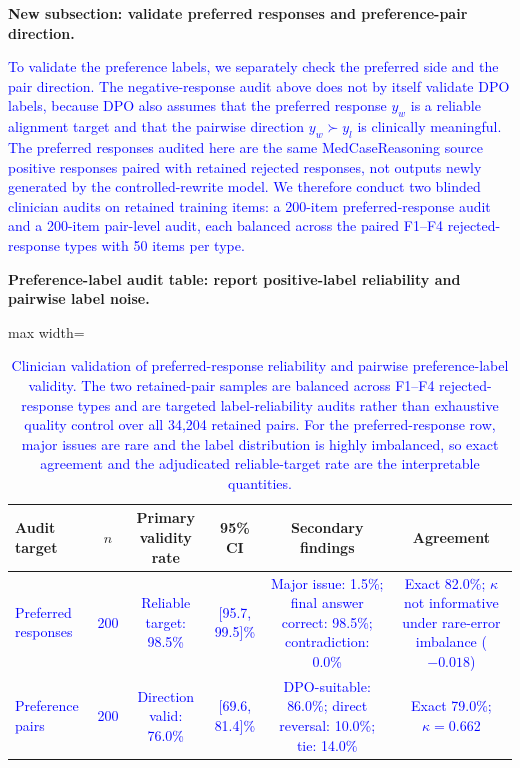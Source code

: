 \documentclass[12pt]{article}
\newcommand{\added}[1]{\textcolor{blue}{#1}}
\begin{document}
\textbf{New subsection: validate preferred responses and preference-pair direction.}
\begin{displayquote}
\added{To validate the preference labels, we separately check the preferred side and the pair direction. The negative-response audit above does not by itself validate DPO labels, because DPO also assumes that the preferred response $y_w$ is a reliable alignment target and that the pairwise direction $y_w \succ y_l$ is clinically meaningful. The preferred responses audited here are the same MedCaseReasoning source positive responses paired with retained rejected responses, not outputs newly generated by the controlled-rewrite model. We therefore conduct two blinded clinician audits on retained training items: a 200-item preferred-response audit and a 200-item pair-level audit, each balanced across the paired F1--F4 rejected-response types with 50 items per type.}
\end{displayquote}

\textbf{Preference-label audit table: report positive-label reliability and pairwise label noise.}
\begin{table}[htbp]
\centering
\small
\caption{\added{Clinician validation of preferred-response reliability and pairwise preference-label validity. The two retained-pair samples are balanced across F1--F4 rejected-response types and are targeted label-reliability audits rather than exhaustive quality control over all 34,204 retained pairs. For the preferred-response row, major issues are rare and the label distribution is highly imbalanced, so exact agreement and the adjudicated reliable-target rate are the interpretable quantities.}}
\label{tab:response_r112_preference_label_audit}
\begin{adjustbox}{max width=\textwidth}
\begin{tabular}{lccccc}
\toprule
\textbf{Audit target} & \textbf{$n$} & \textbf{Primary validity rate} & \textbf{95\% CI} & \textbf{Secondary findings} & \textbf{Agreement} \\
\midrule
\added{Preferred responses} & \added{200} & \added{Reliable target: 98.5\%} & \added{[95.7, 99.5]\%} & \added{Major issue: 1.5\%; final answer correct: 98.5\%; contradiction: 0.0\%} & \added{Exact 82.0\%; $\kappa$ not informative under rare-error imbalance ($-0.018$)} \\
\added{Preference pairs} & \added{200} & \added{Direction valid: 76.0\%} & \added{[69.6, 81.4]\%} & \added{DPO-suitable: 86.0\%; direct reversal: 10.0\%; tie: 14.0\%} & \added{Exact 79.0\%; $\kappa=0.662$} \\
\bottomrule
\end{tabular}
\end{adjustbox}
\end{table}
\end{document}
